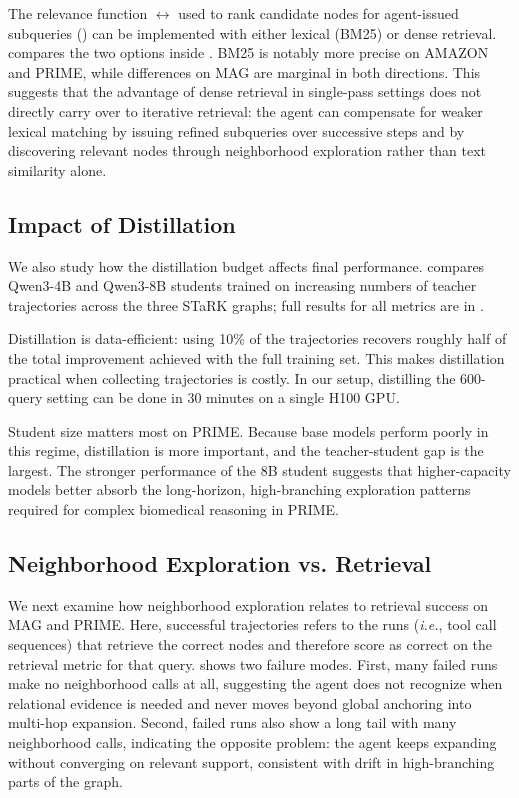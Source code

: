 The relevance function $\rel$ used to rank candidate nodes for agent-issued subqueries () can be implemented with either lexical (BM25) or dense retrieval.  compares the two options inside \retrieverShort. BM25 is notably more precise on AMAZON and PRIME, while differences on MAG are marginal in both directions. This suggests that the advantage of dense retrieval in single-pass settings does not directly carry over to iterative retrieval: the agent can compensate for weaker lexical matching by issuing refined subqueries over successive steps and by discovering relevant nodes through neighborhood exploration rather than text similarity alone.




\subsection{Impact of Distillation}
\label{sec:distillation-impact}

We also study how the distillation budget affects final performance.  compares Qwen3-4B and Qwen3-8B students trained on increasing numbers of teacher trajectories across the three STaRK graphs; full results for all metrics are in .

Distillation is data-efficient: using 10\% of the trajectories recovers roughly half of the total improvement achieved with the full training set. This makes distillation practical when collecting trajectories is costly. In our setup, distilling the 600-query setting can be done in 30 minutes on a single H100 GPU.

Student size matters most on PRIME. Because base models perform poorly in this regime, distillation is more important, and the teacher-student gap is the largest. The stronger performance of the 8B student suggests that higher-capacity models better absorb the long-horizon, high-branching exploration patterns required for complex biomedical reasoning in PRIME.

\subsection{Neighborhood Exploration vs. Retrieval}
\FigNeighborExploreDistribution[h]

We next examine how neighborhood exploration relates to retrieval success on MAG and PRIME. Here, successful trajectories refers to the runs (\textit{i.e.}, tool call sequences) that retrieve the correct nodes and therefore score as correct on the retrieval metric for that query.  shows two failure modes. First, many failed runs make no neighborhood calls at all, suggesting the agent does not recognize when relational evidence is needed and never moves beyond global anchoring into multi-hop expansion. Second, failed runs also show a long tail with many neighborhood calls, indicating the opposite problem: the agent keeps expanding without converging on relevant support, consistent with drift in high-branching parts of the graph. 


